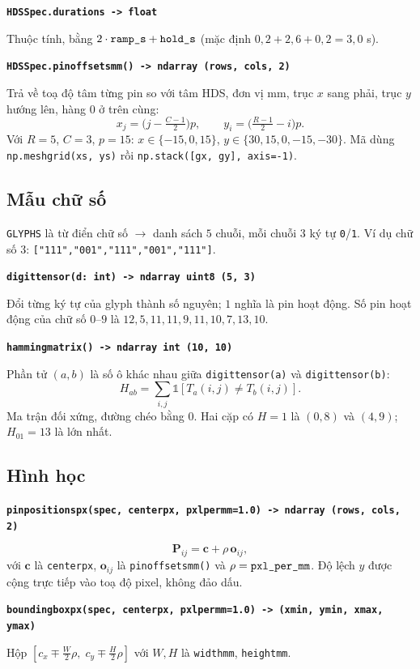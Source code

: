 \documentclass[11pt,a4paper]{article}
\renewcommand{\_}{\textunderscore\hspace{0pt}}
\newcommand{\code}[1]{\texttt{#1}}
\newcommand{\sig}[1]{\par\smallskip\noindent\textbf{\texttt{#1}}\par\nopagebreak}
\begin{document}
\sig{HDSSpec.duration\_s -> float}
Thuộc tính, bằng $2\cdot\code{ramp\_s}+\code{hold\_s}$ (mặc định $0{,}2+2{,}6+0{,}2=3{,}0$ s).

\sig{HDSSpec.pin\_offsets\_mm() -> ndarray (rows, cols, 2)}
Trả về toạ độ tâm từng pin so với tâm HDS, đơn vị mm, trục $x$ sang phải, trục $y$ hướng lên, hàng $0$ ở trên cùng:
\begin{equation}
x_j=\Big(j-\tfrac{C-1}{2}\Big)p,\qquad y_i=\Big(\tfrac{R-1}{2}-i\Big)p .
\end{equation}
Với $R=5$, $C=3$, $p=15$: $x\in\{-15,0,15\}$, $y\in\{30,15,0,-15,-30\}$. Mã dùng \code{np.meshgrid(xs, ys)} rồi \code{np.stack([gx, gy], axis=-1)}.

\subsection{Mẫu chữ số}
\code{\_GLYPHS} là từ điển chữ số $\to$ danh sách $5$ chuỗi, mỗi chuỗi $3$ ký tự \code{0}/\code{1}. Ví dụ chữ số $3$: \code{["111","001","111","001","111"]}.

\sig{digit\_tensor(d: int) -> ndarray uint8 (5, 3)}
Đổi từng ký tự của glyph thành số nguyên; $1$ nghĩa là pin hoạt động. Số pin hoạt động của chữ số $0$--$9$ là $12,5,11,11,9,11,10,7,13,10$.

\sig{hamming\_matrix() -> ndarray int (10, 10)}
Phần tử $(a,b)$ là số ô khác nhau giữa \code{digit\_tensor(a)} và \code{digit\_tensor(b)}:
\begin{equation}
H_{ab}=\sum_{i,j}\mathbb 1\!\left[T_a(i,j)\neq T_b(i,j)\right].
\end{equation}
Ma trận đối xứng, đường chéo bằng $0$. Hai cặp có $H=1$ là $(0,8)$ và $(4,9)$; $H_{01}=13$ là lớn nhất.

\subsection{Hình học}
\sig{pin\_positions\_px(spec, center\_px, pxl\_per\_mm=1.0) -> ndarray (rows, cols, 2)}
\begin{equation}
\mathbf P_{ij}=\mathbf c+\rho\,\mathbf o_{ij},
\end{equation}
với $\mathbf c$ là \code{center\_px}, $\mathbf o_{ij}$ là \code{pin\_offsets\_mm()} và $\rho=\code{pxl\_per\_mm}$. Độ lệch $y$ được cộng trực tiếp vào toạ độ pixel, không đảo dấu.

\sig{bounding\_box\_px(spec, center\_px, pxl\_per\_mm=1.0) -> (xmin, ymin, xmax, ymax)}
Hộp $\left[c_x\mp\tfrac{W}{2}\rho,\; c_y\mp\tfrac{H}{2}\rho\right]$ với $W,H$ là \code{width\_mm}, \code{height\_mm}.
\end{document}
